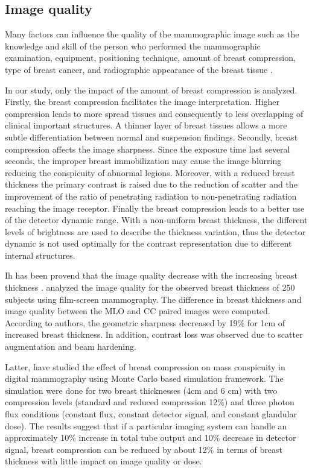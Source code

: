 \subsection{Image quality}

Many factors can influence the quality of the mammographic image such as the knowledge and skill of the person who performed the mammographic examination, equipment, positioning
technique, amount of breast compression, type of breast
cancer, and radiographic appearance of the breast tissue \citep{de_pain_2015,andolina2011mammographic}.

In our study, only the impact of the amount of breast compression is analyzed. Firstly, the breast compression facilitates the image interpretation. Higher compression leads to more spread tissues and  consequently to less overlapping of clinical important structures. A thinner layer of breast tissues allows a more subtle differentiation between normal and suspension findings. Secondly, breast compression affects the image sharpness. Since the exposure time last several seconds, the improper breast immobilization may cause the image blurring reducing the conspicuity of abnormal legions. Moreover, with a reduced breast thickness the primary contrast is raised due to the reduction of scatter and the improvement of the ratio of penetrating radiation to non-penetrating radiation reaching the image receptor. Finally the breast compression leads to a better use of the detector dynamic range. With a non-uniform breast thickness, the different levels of brightness are used to describe the thickness variation, thus the detector dynamic is not used optimally for the contrast representation due to different  internal structures.

Ih has been provend that the image quality decrease with the increasing breast thickness \citep{ko_dose_2013,helvie_breast_1994,saunders_effect_2008,poulos_breast_2003}. \cite{helvie_breast_1994} analyzed  the image quality for the observed breast thickness of 250 subjects using film-screen mammography.  The difference in breast thickness and image quality between the MLO and CC paired images were computed. According to authors,  the geometric sharpness decreased by 19\% for 1cm of increased breast thickness. In addition, contrast loss was observed due to scatter augmentation and beam hardening.

Latter, \cite{saunders_effect_2008} have studied the effect of breast compression on mass conspicuity in digital mammography using Monte Carlo based simulation framework. The simulation were done for two breast thicknesses (4cm and 6 cm) with two compression levels (standard and reduced compression 12\%) and three photon flux conditions (constant
flux, constant detector signal, and constant glandular dose). The results suggest that if a particular imaging system can handle an approximately 10\% increase in total tube output and 10\% decrease in detector signal, breast compression can be reduced by about 12\% in terms of breast thickness with little impact on image quality or dose.

